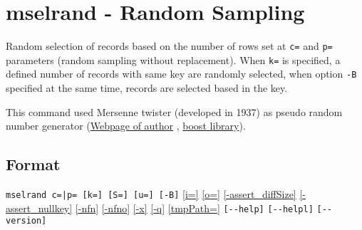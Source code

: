 %

\section{mselrand - Random Sampling\label{sect:mselrand}}
Random selection of records based on the number of rows set at \verb|c=| and \verb|p=| parameters (random sampling without replacement).  When \verb|k=| is specified, a defined number of records with same key are randomly selected, when option \verb|-B| specified at the same time, records are selected based in the key. 

This command used Mersenne twister (developed in 1937) as pseudo random number generator (\href{http://www.math.sci.hiroshima-u.ac.jp/~m-mat/MT/emt.html}{Webpage of author}
, \href{http://www.boost.org/doc/libs/1_54_0/doc/html/boost_random.html}{boost library}).



\subsection*{Format}
\verb/mselrand c=|p= [k=] [S=] [u=] [-B]/
\hyperref[sect:option_i]{[i=]}
\hyperref[sect:option_o]{[o=]}
\hyperref[sect:option_assert_diffSize]{[-assert\_diffSize]}
\hyperref[sect:option_assert_nullkey]{[-assert\_nullkey]}
\hyperref[sect:option_nfn]{[-nfn]} 
\hyperref[sect:option_nfno]{[-nfno]}  
\hyperref[sect:option_x]{[-x]}
\hyperref[sect:option_q]{[-q]}
\hyperref[sect:option_option_tmppath]{[tmpPath=]}
\verb|[--help]|
\verb|[--helpl]|
\verb|[--version]|\\

